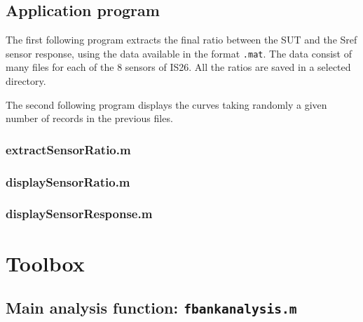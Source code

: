 \documentclass[a4paper, 12pt]{report}
\begin{document}
\section{Application program}
The first following program extracts the final ratio between the SUT and the Sref sensor response, using the data available in the format {\tt .mat}. The data consist of many files for each of the 8 sensors of IS26. All the ratios are saved in a selected directory.

The second following program displays the curves taking randomly a given number of records in the previous files.

\subsection{extractSensorRatio.m}
{\tiny }

\subsection{displaySensorRatio.m}
{\tiny }


\subsection{displaySensorResponse.m}
{\tiny }

\chapter{Toolbox}
\section{Main analysis function: {\tt fbankanalysis.m}}
{\tiny }
\end{document}
